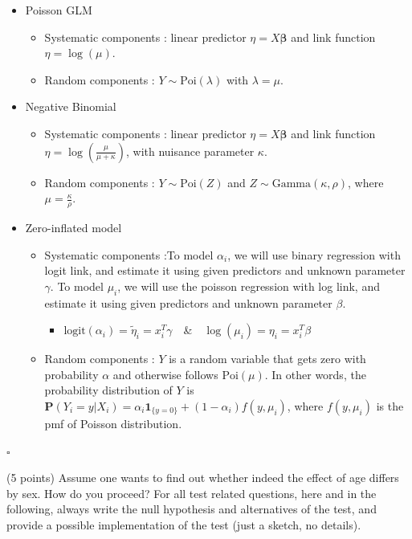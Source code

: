 \documentclass[11pt]{article}
\newcommand{\BE}{\bm{\beta}}
\newcommand{\0}{{\mathbf{0}}}
\newcommand{\1}{{\mathbf{1}}}
\newcommand{\pr}[1]{\noindent{\bf #1.}}
\newcommand{\ed}{\hfill$\square$}
\begin{document}
\vspace{-.5cm}
\begin{itemize}
\setlength\itemsep{-0.2 em}
\item Poisson GLM
	\begin{itemize}
	\item Systematic components : linear predictor $\eta = X\BE$ and link function $\eta = \log(\mu)$.
	\item Random components : $Y \sim \text{Poi}(\lambda)$ with $\lambda = \mu$.
	\end{itemize}
\item Negative Binomial
	\begin{itemize}
	\item Systematic components : linear predictor $\eta = X\BE$ and link function $\eta = \log(\frac{\mu}{\mu + \kappa})$, with nuisance parameter $\kappa$.
	\item Random components : $Y \sim \text{Poi}(Z)$ and $Z \sim \text{Gamma}(\kappa, \rho)$, where $\mu = \frac{\kappa}{\rho}$.
	\end{itemize}
\item Zero-inflated model
	\begin{itemize}
	\item Systematic components :To model $\alpha_i$, we will use binary regression with logit link, and estimate it using given predictors and unknown parameter $\gamma$. To model $\mu_i$, we will use the poisson regression with log link, and estimate it using given predictors and unknown parameter $\beta$.
\begin{itemize}
\item $\text{logit}(\alpha_i) = \tilde{\eta}_i = x_i^T\gamma$\ \ \&\ \ $\log(\mu_i) = \eta_i = x_i^T\beta$
\end{itemize}
	\item Random components : $Y$ is a random variable that gets zero with probability $\alpha$ and otherwise follows $\text{Poi}(\mu)$. In other words, the probability distribution of $Y$ is $\mathbf{P}(Y_i = y | X_i) = \alpha_i \mathbf{1}_{\{y = 0\}} + (1-\alpha_i) f(y,\mu_i)$, where $f(y,\mu_i)$ is the pmf of Poisson distribution.
	\end{itemize}
\end{itemize}
\ed

\pr{2} (5 points) Assume one wants to find out whether indeed the effect of age differs by sex. How do you proceed? For all test related questions, here and in the following, always write the null hypothesis and alternatives of the test, and provide a possible implementation of the test (just a sketch, no details).
\end{document}
